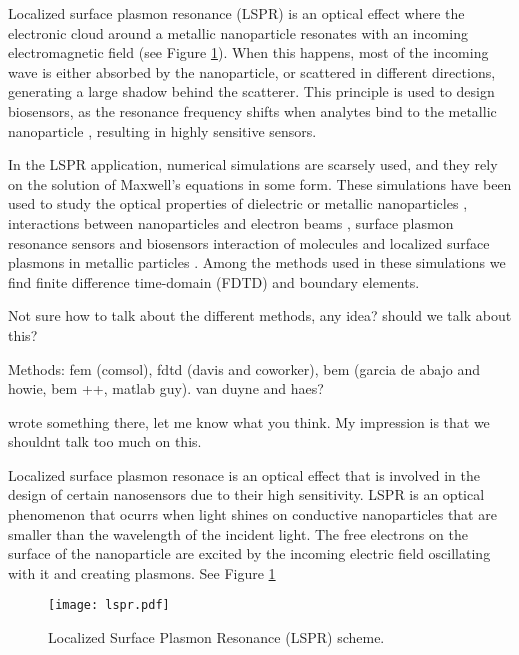 Localized surface plasmon resonance (LSPR) is an optical effect where the electronic
cloud around a metallic nanoparticle resonates with an incoming electromagnetic 
field (see Figure \ref{fig:lspr}). When this happens, most of the incoming wave 
is either absorbed by the nanoparticle, or scattered in different directions,
generating a large shadow behind the scatterer. This principle is used to design 
biosensors, as the resonance frequency shifts when analytes bind to the metallic
nanoparticle \cite{HaesETal2004, HaesVanduyne2002}, resulting in highly sensitive sensors.

In the LSPR application, numerical simulations are scarsely used, and they rely on the 
solution of Maxwell's equations in some form. These simulations have been used to study the 
optical properties of dielectric or metallic nanoparticles \cite{Hohenester2018,
JungPedersenSondergaardPedersenLarsenNielsen2010, VideenSun2003,
MayergoyzFredkinZhang2005, MayergoyzZhang2007}, interactions between nanoparticles
and electron beams \cite{GarciadeabajoAizpurua1997, GarciadeabajoHowie2002},
surface plasmon resonance sensors \cite{JungCampbellChinowskyMarYee1998} and
biosensors \cite{HaesETal2004, HaesVanduyne2002} interaction of molecules and
localized surface plasmons in metallic particles \cite{DavisGomezVernon2010,
AntosiewiczApellClaudioKall2011}. Among the methods used in these simulations 
we find finite difference time-domain (FDTD) and boundary elements\cite{Garciadeabajo}.

{\color{red} Not sure how to talk about the different methods, any idea? should
we talk about this? 

Methods: fem (comsol), fdtd (davis and coworker), bem (garcia de abajo and 
howie, bem ++, matlab guy). van duyne and haes? }
{\color{blue} wrote something there, let me know what you think. My impression is that
we shouldnt talk too much on this.}

Localized surface plasmon resonace is an optical effect that is involved in the
design of certain nanosensors due to their high sensitivity. LSPR is an 
optical phenomenon that ocurrs when light shines on conductive nanoparticles
that are smaller than the wavelength of the incident light. The free electrons
on the surface of the nanoparticle are excited by the incoming electric field
oscillating with it and creating plasmons. See Figure \ref{fig:lspr}

\begin{figure}[h] %
   \centering
   \texttt{[image: lspr.pdf]} 
   \caption{Localized Surface Plasmon Resonance (LSPR) scheme. }
   \label{fig:lspr}
\end{figure}

